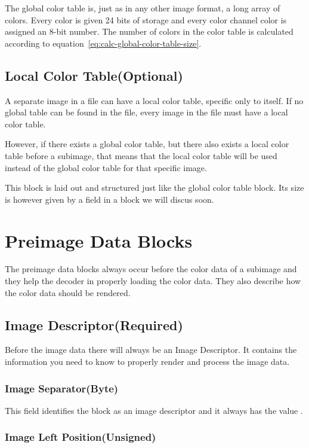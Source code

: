 The global color table is, just as in any other image format, a long
array of colors. Every color is given 24 bits of storage and every
color channel color is assigned an 8-bit number. The number of colors
in the color table is calculated according to equation~\ref{eq:calc-global-color-table-size}.

\subsection{Local Color Table(Optional)}

A separate image in a \gif file can have a local color table, specific
only to itself. If no global table can be found in the file, every
image in the \gif file must have a local color table.

However, if there exists a global color table, but there also exists a
local color table before a subimage, that means that the local color
table will be used instead of the global color table for that specific
image.

This block is laid out and structured just like the global color table
block. Its size is however given by a field in a block we will discus
soon.

\section{Preimage Data Blocks}

The preimage data blocks always occur before the color data of a
subimage and they help the decoder in properly loading the color
data. They also describe how the color data should be rendered.

\subsection{Image Descriptor(Required)}

Before the image data there will always be an Image Descriptor. It
contains the information you need to know to properly render and
process the image data.

\subsubsection{Image Separator(Byte)}

This field identifies the block as an image descriptor and it always
has the value .

\subsubsection{Image Left Position(Unsigned)}
